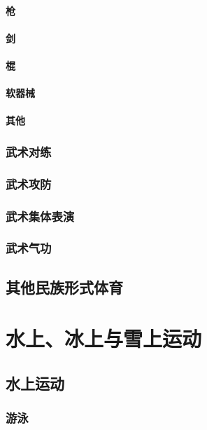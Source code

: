 \documentclass[UTF8]{../../ApplicationUniverse}
\begin{document}
        \subsubsection{枪}
        \subsubsection{剑}
        \subsubsection{棍}
        \subsubsection{软器械}
        \subsubsection{其他}
    \subsection{武术对练}
    \subsection{武术攻防}
    \subsection{武术集体表演}
    \subsection{武术气功}

\section{其他民族形式体育}








\chapter{水上、冰上与雪上运动}
\section{水上运动}
    \subsection{游泳}
\end{document}
